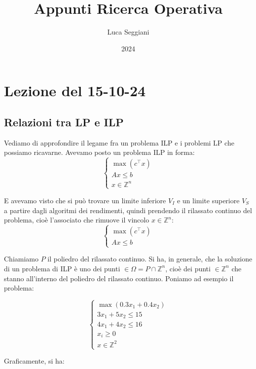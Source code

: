 \documentclass[a4paper,11pt]{article}
\title{Appunti Ricerca Operativa}
\author{Luca Seggiani}
\date{2024}
\begin{document}
\section{Lezione del 15-10-24}

\thispagestyle{empty}
\pagestyle{fancy}


\subsection{Relazioni tra LP e ILP}
Vediamo di approfondire il legame fra un problema ILP e i problemi LP che possiamo ricavarne.
Avevamo posto un problema ILP in forma:
\[
	\begin{cases}
			\max (c^\intercal x) \\ 
			Ax \leq b \\ 
			x \in \mathbb{Z}^n
	\end{cases}
\]

E avevamo visto che si può trovare un limite inferiore $V_I$ e un limite superiore $V_S$ a partire dagli algoritmi dei rendimenti, quindi prendendo il rilassato continuo del problema, cioè l'associato che rimuove il vincolo $x \in \mathbb{Z}^n$:
\[
	\begin{cases}
			\max (c^\intercal x) \\ 
			Ax \leq b
	\end{cases}
\]

Chiamiamo $P$ il poliedro del rilassato continuo.
Si ha, in generale, che la soluzione di un problema di ILP è uno dei punti $\in \Omega = P \cap \mathbb{Z}^n$, cioè dei punti $\in \mathbb{Z}^n$ che stanno all'interno del poliedro del rilassato continuo.
Poniamo ad esempio il problema:

\[
	\begin{cases}
		\max(0.3 x_1 + 0.4 x_2) \\
		3 x_1 + 5 x_2 \leq 15 \\ 
		4 x_1 +  4 x_2 \leq 16 \\ 
		x_i \geq 0 \\
		x \in \mathbb{Z}^2
	\end{cases}
\]

Graficamente, si ha:
\end{document}
